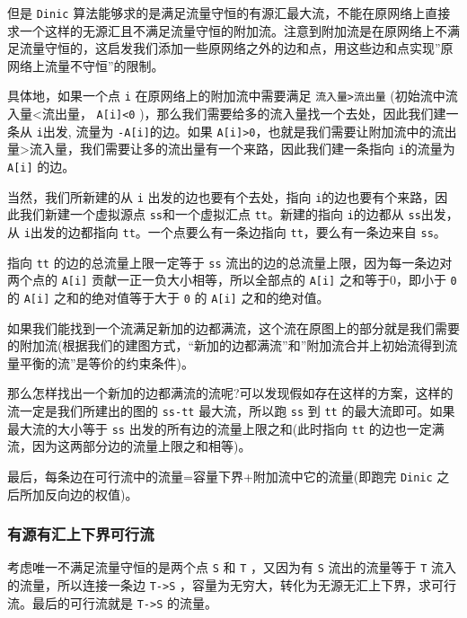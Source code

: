\documentclass[UTF-8]{ctexart}
\begin{document}
	但是 \texttt{Dinic} 算法能够求的是满足流量守恒的有源汇最大流，不能在原网络上直接求一个这样的无源汇且不满足流量守恒的附加流。注意到附加流是在原网络上不满足流量守恒的，这启发我们添加一些原网络之外的边和点，用这些边和点实现”原网络上流量不守恒”的限制。  
	
	具体地，如果一个点 \texttt{i} 在原网络上的附加流中需要满足 \texttt{流入量>流出量} (初始流中流入量<流出量， \texttt{A[i]<0} )，那么我们需要给多的流入量找一个去处，因此我们建一条从 \texttt{i}出发, 流量为 \texttt{-A[i]}的边。如果 \texttt{A[i]>0}，也就是我们需要让附加流中的流出量>流入量，我们需要让多的流出量有一个来路，因此我们建一条指向 \texttt{i}的流量为 \texttt{A[i]} 的边。  
	
	当然，我们所新建的从 \texttt{i} 出发的边也要有个去处，指向 \texttt{i}的边也要有个来路，因此我们新建一个虚拟源点 \texttt{ss}和一个虚拟汇点 \texttt{tt}。新建的指向 \texttt{i}的边都从 \texttt{ss}出发，从 \texttt{i}出发的边都指向 \texttt{tt}。一个点要么有一条边指向 \texttt{tt}，要么有一条边来自 \texttt{ss}。  
	
	指向 \texttt{tt} 的边的总流量上限一定等于 \texttt{ss} 流出的边的总流量上限，因为每一条边对两个点的 \texttt{A[i]} 贡献一正一负大小相等，所以全部点的 \texttt{A[i]} 之和等于0，即小于 \texttt{0} 的 \texttt{A[i]} 之和的绝对值等于大于 \texttt{0} 的 \texttt{A[i]} 之和的绝对值。  
	
	如果我们能找到一个流满足新加的边都满流，这个流在原图上的部分就是我们需要的附加流(根据我们的建图方式，“新加的边都满流”和”附加流合并上初始流得到流量平衡的流”是等价的约束条件)。  
	
	那么怎样找出一个新加的边都满流的流呢?可以发现假如存在这样的方案，这样的流一定是我们所建出的图的 \texttt{ss-tt} 最大流，所以跑 \texttt{ss} 到 \texttt{tt} 的最大流即可。如果最大流的大小等于 \texttt{ss} 出发的所有边的流量上限之和(此时指向 \texttt{tt} 的边也一定满流，因为这两部分边的流量上限之和相等)。  
	
	最后，每条边在可行流中的流量=容量下界+附加流中它的流量(即跑完 \texttt{Dinic} 之后所加反向边的权值)。

	\subsubsection{有源有汇上下界可行流}
	
	考虑唯一不满足流量守恒的是两个点 \texttt{S} 和 \texttt{T} ，又因为有 \texttt{S} 流出的流量等于 \texttt{T} 流入的流量，所以连接一条边 \texttt{T->S} ，容量为无穷大，转化为无源无汇上下界，求可行流。最后的可行流就是 \texttt{T->S} 的流量。
	
\end{document}
